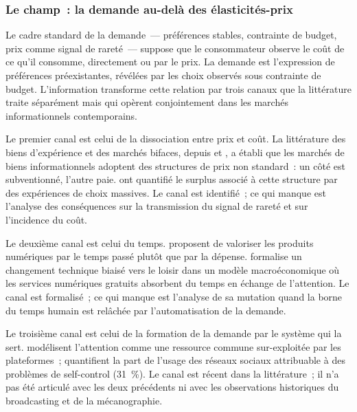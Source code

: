 \subsubsection{Le champ~: la demande au-delà des élasticités-prix}

Le cadre standard de la demande~--- préférences stables, contrainte de budget, prix comme signal de rareté~--- suppose que le consommateur observe le coût de ce qu'il consomme, directement ou par le prix. La demande est l'expression de préférences préexistantes, révélées par les choix observés sous contrainte de budget. L'information transforme cette relation par trois canaux que la littérature traite séparément mais qui opèrent conjointement dans les marchés informationnels contemporains.

Le premier canal est celui de la dissociation entre prix et coût. La littérature des biens d'expérience et des marchés bifaces, depuis \textcite{shapiro_information_1999} et \textcite{rochet_platform_2003}, a établi que les marchés de biens informationnels adoptent des structures de prix non standard~: un côté est subventionné, l'autre paie. \textcite{brynjolfsson_using_2019} ont quantifié le surplus associé à cette structure par des expériences de choix massives. Le canal est identifié~; ce qui manque est l'analyse des conséquences sur la transmission du signal de rareté et sur l'incidence du coût.

Le deuxième canal est celui du temps. \textcite{goolsbee_valuing_2006} proposent de valoriser les produits numériques par le temps passé plutôt que par la dépense. \textcite{rachel_leisure_2024} formalise un changement technique biaisé vers le loisir dans un modèle macroéconomique où les services numériques gratuits absorbent du temps en échange de l'attention. Le canal est formalisé~; ce qui manque est l'analyse de sa mutation quand la borne du temps humain est relâchée par l'automatisation de la demande.

Le troisième canal est celui de la formation de la demande par le système qui la sert. \textcite{anderson_competition_2012} modélisent l'attention comme une ressource commune sur-exploitée par les plateformes~; \textcite{allcott_digital_2022} quantifient la part de l'usage des réseaux sociaux attribuable à des problèmes de self-control (31~\%). Le canal est récent dans la littérature~; il n'a pas été articulé avec les deux précédents ni avec les observations historiques du broadcasting et de la mécanographie.


